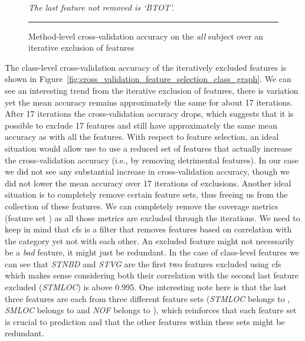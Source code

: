\begin{figure}[ht!]
  \centering
  \begin{adjustbox}{max size={.95\textwidth}{.95\textheight}}
    
  \end{adjustbox}
  \caption{Method-level cross-validation accuracy on the \emph{all} subject over an iterative exclusion of features}
  \vspace{1mm}
  \footnotesize{\emph{The last feature not removed is `BTOT'.}}
  \vspace{2mm}
  \hrule
  \label{fig:cross_validation_feature_selection_method_graph}
\end{figure}

The class-level cross-validation accuracy of the iteratively excluded features is shown in Figure~\ref{fig:cross_validation_feature_selection_class_graph}. We can see an interesting trend from the iterative exclusion of features, there is variation yet the mean accuracy remains approximately the same for about 17 iterations. After 17 iterations the cross-validation accuracy drops, which suggests that it is possible to exclude 17 features and still have approximately the same mean accuracy as with all the features. With respect to feature selection, an ideal situation would allow use to use a reduced set of features that actually increase the cross-validation accuracy (i.e., by removing detrimental features). In our case we did not see any substantial increase in cross-validation accuracy, though we did not lower the mean accuracy over 17 iterations of exclusions. Another ideal situation is to completely remove certain feature sets, thus freeing us from the collection of these features. We can completely remove the coverage metrics (feature set ) as all those metrics are excluded through the iterations. We need to keep in mind that \gls{cfs} is a filter that removes features based on correlation with the category yet not with each other. An excluded feature might not necessarily be a \emph{bad} feature, it might just be redundant. In the case of class-level features we can see that \emph{STNBD} and \emph{STVG} are the first two features excluded using \gls{cfs} which makes sense considering both their correlation with the second last feature excluded (\emph{STMLOC}) is above 0.995. One interesting note here is that the last three features are each from three different feature sets (\emph{STMLOC} belongs to , \emph{SMLOC} belongs to  and \emph{NOF} belongs to ), which reinforces that each feature set is crucial to prediction and that the other features within these sets might be redundant.

